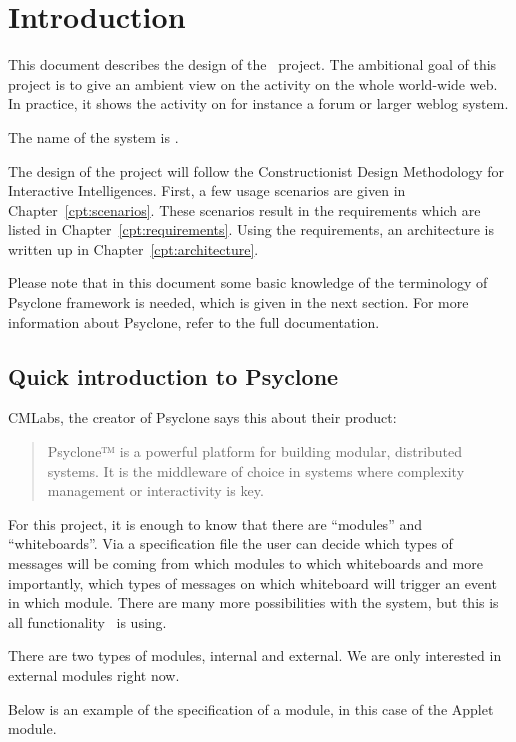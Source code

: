 \chapter{\label{cpt:design:introduction}Introduction}

This document describes the design of the \AmbE\ project. The ambitional goal
of this project is to give an ambient view on the activity on the whole
world-wide web. In practice, it shows the activity on for instance a forum or
larger weblog system.

The name of the system is \Amber{}.

The design of the project will follow the Constructionist Design Methodology
for Interactive Intelligences\cite{CDM}. First, a few usage scenarios are given
in Chapter~\ref{cpt:scenarios}. These scenarios result in the requirements
which are listed in Chapter~\ref{cpt:requirements}. Using the requirements, an
architecture is written up in Chapter~\ref{cpt:architecture}.

Please note that in this document some basic knowledge of the terminology of
Psyclone framework is needed, which is given in the next section. For more
information about Psyclone, refer to the full
documentation\cite{PsycloneManual}.

\section{Quick introduction to Psyclone}

CMLabs, the creator of Psyclone says this about their product:

\begin{quote}
  Psyclone™ is a powerful platform for building modular, distributed systems.
  It is the middleware of choice in systems where complexity management or
  interactivity is key.
\end{quote}

For this project, it is enough to know that there are ``modules'' and
``whiteboards''. Via a specification file the user can decide which types of
messages will be coming from which modules to which whiteboards and more
importantly, which types of messages on which whiteboard will trigger an event
in which module. There are many more possibilities with the system, but this is
all functionality \Amber\ is using.

There are two types of modules, internal and external. We are only interested
in external modules right now.

Below is an example of the specification of a module, in this case of the
Applet module. 

